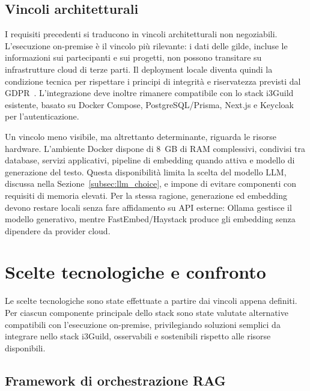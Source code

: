 \subsection{Vincoli architetturali}
\label{subsec:constraints}

I requisiti precedenti si traducono in vincoli architetturali non negoziabili.
L'esecuzione on-premise è il vincolo più rilevante: i dati delle gilde, incluse
le informazioni sui partecipanti e sui progetti, non possono transitare su
infrastrutture cloud di terze parti. Il deployment locale diventa quindi la
condizione tecnica per rispettare i principi di integrità e riservatezza
previsti dal GDPR~\cite{gdpr2016}. L'integrazione deve inoltre rimanere
compatibile con lo stack i3Guild esistente, basato su Docker Compose,
PostgreSQL/Prisma, Next.js e Keycloak per l'autenticazione.

Un vincolo meno visibile, ma altrettanto determinante, riguarda le risorse
hardware. L'ambiente Docker dispone di 8~GB di RAM complessivi, condivisi tra
database, servizi applicativi, pipeline di embedding quando attiva e modello di
generazione del testo. Questa disponibilità limita la scelta del modello LLM,
discussa nella Sezione~\ref{subsec:llm_choice}, e impone di evitare componenti
con requisiti di memoria elevati. Per la stessa ragione, generazione ed
embedding devono restare locali senza fare affidamento su API esterne: Ollama
gestisce il modello generativo, mentre FastEmbed/Haystack produce gli embedding
senza dipendere da provider cloud.

\section{Scelte tecnologiche e confronto}
\label{sec:tech_choices}

Le scelte tecnologiche sono state effettuate a partire dai vincoli appena
definiti. Per ciascun componente principale dello stack sono state valutate
alternative compatibili con l'esecuzione on-premise, privilegiando soluzioni
semplici da integrare nello stack i3Guild, osservabili e sostenibili rispetto
alle risorse disponibili.

\subsection{Framework di orchestrazione RAG}
\label{subsec:framework_choice}

